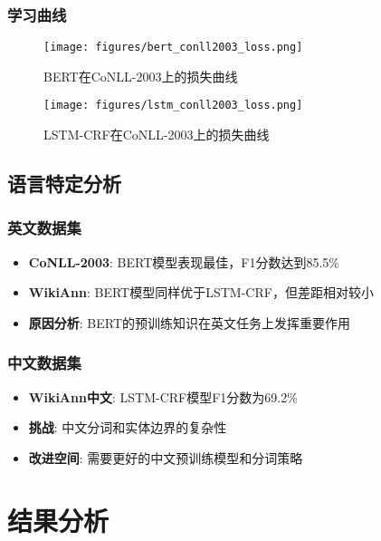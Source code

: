 \documentclass[12pt,a4paper]{article}
\begin{document}
\subsubsection{学习曲线}

\begin{figure}[H]
\centering
\begin{minipage}{0.48\textwidth}
\centering
\texttt{[image: figures/bert\_conll2003\_loss.png]}
\caption{BERT在CoNLL-2003上的损失曲线}
\end{minipage}
\begin{minipage}{0.48\textwidth}
\centering
\texttt{[image: figures/lstm\_conll2003\_loss.png]}
\caption{LSTM-CRF在CoNLL-2003上的损失曲线}
\end{minipage}
\end{figure}

\subsection{语言特定分析}

\subsubsection{英文数据集}
\begin{itemize}
    \item \textbf{CoNLL-2003}: BERT模型表现最佳，F1分数达到85.5\%
    \item \textbf{WikiAnn}: BERT模型同样优于LSTM-CRF，但差距相对较小
    \item \textbf{原因分析}: BERT的预训练知识在英文任务上发挥重要作用
\end{itemize}

\subsubsection{中文数据集}
\begin{itemize}
    \item \textbf{WikiAnn中文}: LSTM-CRF模型F1分数为69.2\%
    \item \textbf{挑战}: 中文分词和实体边界的复杂性
    \item \textbf{改进空间}: 需要更好的中文预训练模型和分词策略
\end{itemize}

\section{结果分析}
\end{document}
